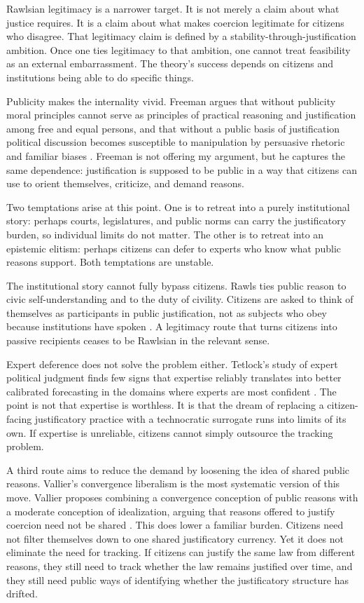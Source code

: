 \documentclass[12pt]{article}
\begin{document}
Rawlsian legitimacy is a narrower target. It is not merely a claim about what justice requires. It is a claim about what makes coercion legitimate for citizens who disagree. That legitimacy claim is defined by a stability-through-justification ambition. Once one ties legitimacy to that ambition, one cannot treat feasibility as an external embarrassment. The theory's success depends on citizens and institutions being able to do specific things.

Publicity makes the internality vivid. Freeman argues that without publicity moral principles cannot serve as principles of practical reasoning and justification among free and equal persons, and that without a public basis of justification political discussion becomes susceptible to manipulation by persuasive rhetoric and familiar biases \parencite[p.~11]{freeman2007burdens}. Freeman is not offering my argument, but he captures the same dependence: justification is supposed to be public in a way that citizens can use to orient themselves, criticize, and demand reasons.

Two temptations arise at this point. One is to retreat into a purely institutional story: perhaps courts, legislatures, and public norms can carry the justificatory burden, so individual limits do not matter. The other is to retreat into an epistemic elitism: perhaps citizens can defer to experts who know what public reasons support. Both temptations are unstable.

The institutional story cannot fully bypass citizens. Rawls ties public reason to civic self-understanding and to the duty of civility. Citizens are asked to think of themselves as participants in public justification, not as subjects who obey because institutions have spoken \parencite[p.~444]{rawls2005political}. A legitimacy route that turns citizens into passive recipients ceases to be Rawlsian in the relevant sense.

Expert deference does not solve the problem either. Tetlock's study of expert political judgment finds few signs that expertise reliably translates into better calibrated forecasting in the domains where experts are most confident \parencite[p.~20]{tetlock2005expert}. The point is not that expertise is worthless. It is that the dream of replacing a citizen-facing justificatory practice with a technocratic surrogate runs into limits of its own. If expertise is unreliable, citizens cannot simply outsource the tracking problem.

A third route aims to reduce the demand by loosening the idea of shared public reasons. Vallier's convergence liberalism is the most systematic version of this move. Vallier proposes combining a convergence conception of public reasons with a moderate conception of idealization, arguing that reasons offered to justify coercion need not be shared \parencite[p.~8]{vallier2011diss}. This does lower a familiar burden. Citizens need not filter themselves down to one shared justificatory currency. Yet it does not eliminate the need for tracking. If citizens can justify the same law from different reasons, they still need to track whether the law remains justified over time, and they still need public ways of identifying whether the justificatory structure has drifted.
\end{document}
